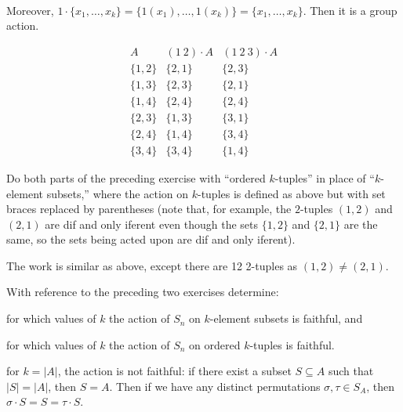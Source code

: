 \begin{problems}
\begin{solalph}
\begin{align*}
        \end{align*}
        Moreover, $1 \cdot \{x_1, \ldots, x_k\} = \{1(x_1), \ldots, 1(x_k)\} = \{x_1, \ldots, x_k\}$. Then it is a group action.
        \item
        \[
        \begin{array}{c|c|c}
            A & (1\ 2) \cdot A & (1\ 2\ 3) \cdot A \\
            \hline
            \{1, 2\} & \{2, 1\} & \{2, 3\} \\
            \{1, 3\} & \{2, 3\} & \{2, 1\} \\
            \{1, 4\} & \{2, 4\} & \{2, 4\} \\
            \{2, 3\} & \{1, 3\} & \{3, 1\} \\
            \{2, 4\} & \{1, 4\} & \{3, 4\} \\
            \{3, 4\} & \{3, 4\} & \{1, 4\}
        \end{array}
        \]
    \end{solalph}
    \item Do both parts of the preceding exercise with ``ordered $k$-tuples'' in place of ``$k$-element subsets,'' where the action on $k$-tuples is defined as above but with set braces replaced by parentheses (note that, for example, the $2$-tuples $(1,2)$ and $(2,1)$ are dif and only iferent even though the sets $\{1,2\}$ and $\{2,1\}$ are the same, so the sets being acted upon are dif and only iferent).
    \begin{sol}
        The work is similar as above, except there are 12 2-tuples as $(1, 2) \neq (2, 1)$.
    \end{sol}
    \item With reference to the preceding two exercises determine:
    \begin{problems}
        \item for which values of $k$ the action of $S_n$ on $k$-element subsets is faithful, and
        \item for which values of $k$ the action of $S_n$ on ordered $k$-tuples is faithful.
    \end{problems}
    \begin{solalph}
        \item for $k = |A|$, the action is not faithful: if there exist a subset $S \subseteq A$ such that $|S| = |A|$, then $S = A$. Then if we have any distinct permutations $\sigma, \tau \in S_A$, then $\sigma \cdot S = S = \tau \cdot S$.
        

\end{solalph}
\end{problems}

